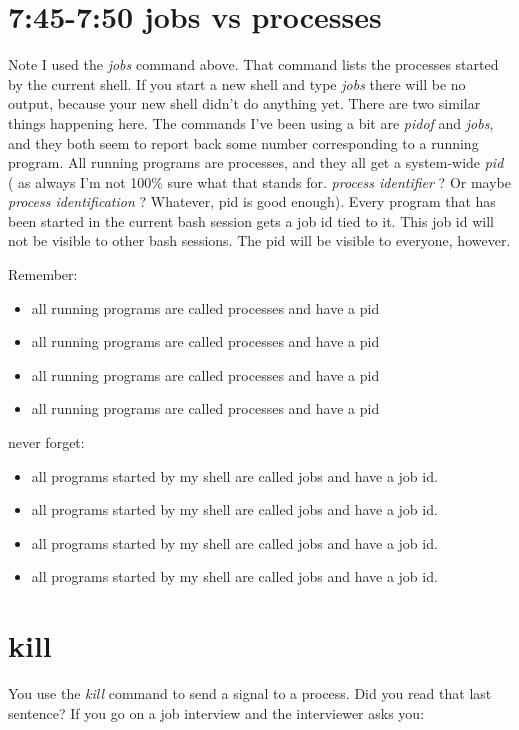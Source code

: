 \documentclass[12pt]{article}
\begin{document}
\section{7:45-7:50 jobs vs processes}
Note I used the \textit{jobs} command above. That command lists the processes started by the current shell. If you start a new shell and type \textit{jobs} there will be no output, because your new shell didn't do anything yet.
There are two similar things happening here. The commands I've been using a bit
are \textit{pidof} and \textit{jobs}, and they both seem to report back some
number corresponding to a running program. All running programs are processes,
and they all get a system-wide \textit{pid} ( as always I'm not 100\% sure what
that stands for. \textit{process identifier} ? Or maybe \textit{process
identification} ? Whatever, pid is good enough). Every program that has been
started in the current bash session gets a job id tied to it. This job id will
not be visible to other bash sessions. The pid will be visible to everyone,
however.

Remember:
\begin{itemize}
\item all running programs are called processes and have a pid
\item all running programs are called processes and have a pid
\item all running programs are called processes and have a pid
\item all running programs are called processes and have a pid
\end{itemize}

never forget:

\begin{itemize}
\item all programs started by my shell are called jobs and have a job id.
\item all programs started by my shell are called jobs and have a job id.
\item all programs started by my shell are called jobs and have a job id.
\item all programs started by my shell are called jobs and have a job id.
\end{itemize}

\section{ kill }
You use the \textit{kill} command to send a signal to a process. Did you read
that last sentence? If you go on a job interview and the interviewer asks you:
\end{document}
